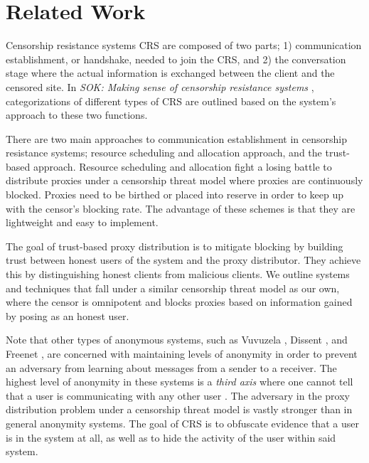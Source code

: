
\chapter{Related Work} 
\label{sec:related}


Censorship resistance systems \ac{CRS} are composed of two parts; 1) communication establishment, or handshake, needed to join the \ac{CRS}, and 2) the conversation stage where the actual information is exchanged between the client and the censored site. In \textit{SOK: Making sense of censorship resistance systems} \cite{khattak2016sok}, categorizations of different types of \ac{CRS} are outlined based on the system's approach to these two functions. 

There are two main approaches to communication establishment in censorship resistance systems; resource scheduling and allocation approach, and the trust-based approach. Resource scheduling and allocation fight a losing battle to distribute proxies under a censorship threat model where proxies are continuously blocked. Proxies need to be birthed or placed into reserve in order to keep up with the censor's blocking rate. The advantage of these schemes is that they are lightweight and easy to implement.

The goal of trust-based proxy distribution is to mitigate blocking by building trust between honest users of the system and the proxy distributor. They achieve this by distinguishing honest clients from malicious clients. We outline systems and techniques that fall under a similar censorship threat model as our own, where the censor is omnipotent and blocks proxies based on information gained by posing as an honest user.

Note that other types of anonymous systems, such as Vuvuzela \cite{vandenHooff:2015:VSP:2815400.2815417}, Dissent \cite{corrigan2010dissent}, and Freenet \cite{clarke2001freenet}, are concerned with maintaining levels of anonymity in order to prevent an adversary from learning about messages from a sender to a receiver. The highest level of anonymity in these systems is a \textit{third axis} where one cannot tell that a user is communicating with any other user \cite{reiter1999anonymous}. The adversary in the proxy distribution problem under a censorship threat model is vastly stronger than in general anonymity systems. The goal of \ac{CRS} is to obfuscate evidence that a user is in the system at all, as well as to hide the activity of the user within said system.


